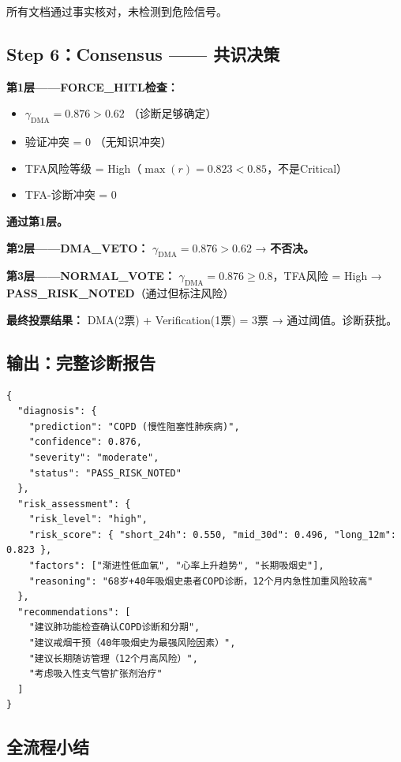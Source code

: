\documentclass[11pt,a4paper]{ctexart}
\begin{document}
所有文档通过事实核对，未检测到危险信号。

\subsection{Step 6：Consensus —— 共识决策}

\textbf{第1层——FORCE\_HITL检查：}
\begin{itemize}[nosep]
\item $\gamma_{\text{DMA}} = 0.876 > 0.62$ \checkmark\quad（诊断足够确定）
\item 验证冲突 = 0 \checkmark\quad（无知识冲突）
\item TFA风险等级 = High（$\max(r) = 0.823 < 0.85$，不是Critical）\checkmark
\item TFA-诊断冲突 = 0 \checkmark
\end{itemize}
\textbf{通过第1层。}

\textbf{第2层——DMA\_VETO：} $\gamma_{\text{DMA}} = 0.876 > 0.62$ → \textbf{不否决。}

\textbf{第3层——NORMAL\_VOTE：} $\gamma_{\text{DMA}} = 0.876 \geq 0.8$，TFA风险 = High → \textbf{PASS\_RISK\_NOTED}（通过但标注风险）

\textbf{最终投票结果：} DMA(2票) + Verification(1票) = 3票 → 通过阈值。诊断获批。

\subsection{输出：完整诊断报告}

\begin{codebox}
\begin{verbatim}
{
  "diagnosis": {
    "prediction": "COPD (慢性阻塞性肺疾病)",
    "confidence": 0.876,
    "severity": "moderate",
    "status": "PASS_RISK_NOTED"
  },
  "risk_assessment": {
    "risk_level": "high",
    "risk_score": { "short_24h": 0.550, "mid_30d": 0.496, "long_12m": 0.823 },
    "factors": ["渐进性低血氧", "心率上升趋势", "长期吸烟史"],
    "reasoning": "68岁+40年吸烟史患者COPD诊断，12个月内急性加重风险较高"
  },
  "recommendations": [
    "建议肺功能检查确认COPD诊断和分期",
    "建议戒烟干预（40年吸烟史为最强风险因素）",
    "建议长期随访管理（12个月高风险）",
    "考虑吸入性支气管扩张剂治疗"
  ]
}
\end{verbatim}
\end{codebox}

\subsection{全流程小结}
\end{document}
